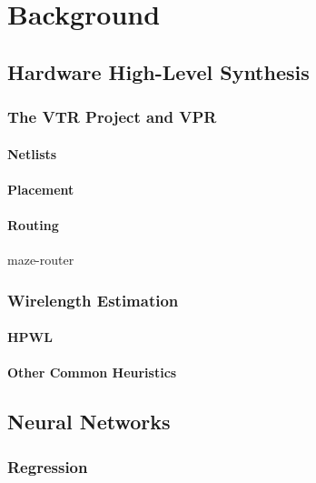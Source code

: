 
\chapter{Background}\label{ch:relatedwork}
\glsresetall %

\section{Hardware High-Level Synthesis}

\subsection{The VTR Project and VPR}

\subsubsection{Netlists}

\subsubsection{Placement}

\subsubsection{Routing}

maze-router

\subsection{Wirelength Estimation}

\subsubsection{\gls{HPWL}}

\subsubsection{Other Common Heuristics}

\section{Neural Networks}

\subsection{Regression}

